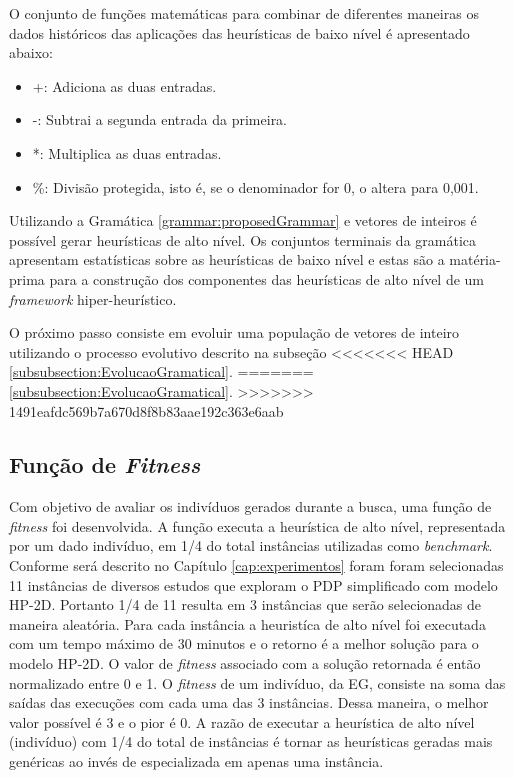  
  
  O conjunto de funções matemáticas para combinar de diferentes maneiras os dados históricos das aplicações das heurísticas de baixo nível é apresentado abaixo:
  
  \begin{itemize}
  	\item +: Adiciona as duas entradas.
  	\item -: Subtrai a segunda entrada da primeira.
  	\item *: Multiplica as duas entradas.
  	\item \%: Divisão protegida, isto é, se o denominador for 0, o altera para 0,001.
  \end{itemize}
  
  
  Utilizando a Gramática \ref{grammar:proposedGrammar} e vetores de inteiros é possível gerar heurísticas de alto nível. Os conjuntos terminais da gramática apresentam estatísticas sobre as heurísticas de baixo nível e estas são a matéria-prima para a construção dos componentes das heurísticas de alto nível de um \textit{framework} hiper-heurístico. 
  
  

  
  O próximo passo consiste em evoluir uma população de vetores de inteiro utilizando o processo evolutivo descrito na subseção 
<<<<<<< HEAD
	  \ref{subsubsection:EvolucaoGramatical}. %
=======
  \ref{subsubsection:EvolucaoGramatical}. %
>>>>>>> 1491eafdc569b7a670d8f8b83aae192c363e6aab
  
  
  \subsection{Função de \textit{Fitness}}
  \label{sub:funcfitness}
  
  
  	
 Com objetivo de avaliar os indivíduos gerados durante a busca, uma função de \textit{fitness} foi desenvolvida. A função executa a heurística de alto nível, representada por um dado indivíduo, 
 em 1/4 do total instâncias utilizadas como \textit{benchmark}. Conforme será descrito no Capítulo \ref{cap:experimentos} foram   foram selecionadas 11 instâncias de diversos estudos que exploram o PDP simplificado com modelo HP-2D. Portanto 1/4 de 11 resulta em 3 instâncias que serão selecionadas de maneira aleatória. Para cada instância a heuristíca de alto nível foi executada com um tempo máximo de 30 minutos e o retorno é a melhor solução para o modelo HP-2D. O valor de \textit{fitness} associado com a solução retornada é então normalizado entre 0 e 1. O \textit{fitness} de um indivíduo, da EG, consiste na soma das saídas das execuções com cada uma das 3 instâncias. Dessa maneira, o melhor valor possível é 3 e o pior é 0. A razão de executar a heurística de alto nível (indivíduo) com 1/4 do total de instâncias é tornar as heurísticas geradas mais genéricas ao invés de especializada em apenas uma instância. 
  
